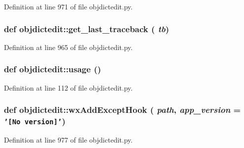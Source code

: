 Definition at line 971 of file objdictedit.py.\hypertarget{namespaceobjdictedit_54964903be300a8ce9ee85eb67d5956e}{
\subsubsection[get\_\-last\_\-traceback]{\setlength{\rightskip}{0pt plus 5cm}def objdictedit::get\_\-last\_\-traceback ( {\em tb})}}
\label{namespaceobjdictedit_54964903be300a8ce9ee85eb67d5956e}




Definition at line 965 of file objdictedit.py.\hypertarget{namespaceobjdictedit_32e0bb76ebce2730cbb78c694b11e015}{
\subsubsection[usage]{\setlength{\rightskip}{0pt plus 5cm}def objdictedit::usage ()}}
\label{namespaceobjdictedit_32e0bb76ebce2730cbb78c694b11e015}




Definition at line 112 of file objdictedit.py.\hypertarget{namespaceobjdictedit_7a105b1694af4346e8de2a012657d49f}{
\subsubsection[wxAddExceptHook]{\setlength{\rightskip}{0pt plus 5cm}def objdictedit::wx\-Add\-Except\-Hook ( {\em path},  {\em app\_\-version} = {\tt '\mbox{[}No~version\mbox{]}'})}}
\label{namespaceobjdictedit_7a105b1694af4346e8de2a012657d49f}




Definition at line 977 of file objdictedit.py.